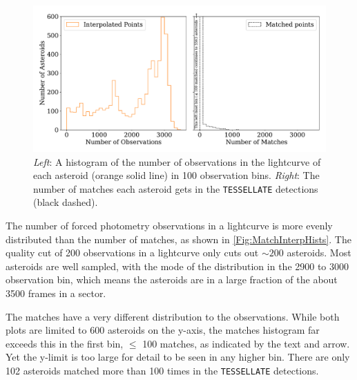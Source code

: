 \documentclass{UCreport}
\begin{document}
\begin{figure} %
  \centering
  \includegraphics[width=\textwidth]{../OzData/pointsMatchesNumberHistdouble1.pdf}
  \caption[Number of observations or matches]{\textit{Left}: A histogram of the number of observations in the lightcurve of each asteroid (orange solid line) in 100 observation bins. \textit{Right}: The number of matches each asteroid gets in the \texttt{TESSELLATE} detections (black dashed).
  }
  \label{Fig:MatchInterpHists}
\end{figure}

The number of forced photometry observations in a lightcurve is more evenly distributed than the number of matches, as shown in \autoref{Fig:MatchInterpHists}.
The quality cut of 200 observations in a lightcurve only cuts out $\sim 200$ asteroids.
Most asteroids are well sampled, with the mode of the distribution in the 2900 to 3000 observation bin, which means the asteroids are in a large fraction of the about 3500 frames in a sector.

The matches have a very different distribution to the observations.
While both plots are limited to 600 asteroids on the y-axis, the matches histogram far exceeds this in the first bin, $\leq$ 100 matches, as indicated by the text and arrow.
Yet the y-limit is too large for detail to be seen in any higher bin.
There are only 102 asteroids matched more than 100 times in the \texttt{TESSELLATE} detections.
\end{document}
